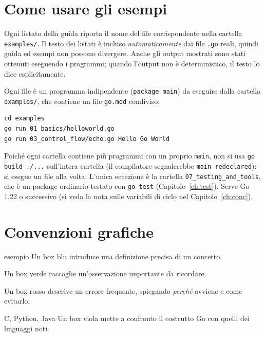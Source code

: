 \documentclass[11pt,a4paper]{report}
\newcommand{\cod}[1]{\texttt{#1}}
\begin{document}
\section*{Come usare gli esempi}

Ogni listato della guida riporta il nome del file corrispondente nella cartella
\texttt{examples/}. Il testo dei listati è incluso \emph{automaticamente} dai file
\texttt{.go} reali, quindi guida ed esempi non possono divergere. Anche gli output
mostrati sono stati ottenuti eseguendo i programmi; quando l'output non è
deterministico, il testo lo dice esplicitamente.

Ogni file è un programma indipendente (\cod{package main}) da eseguire dalla
cartella \texttt{examples/}, che contiene un file \texttt{go.mod} condiviso:

\begin{lstlisting}[style=shell]
cd examples
go run 01_basics/helloworld.go
go run 03_control_flow/echo.go Hello Go World
\end{lstlisting}

Poiché ogni cartella contiene più programmi con un proprio \cod{main}, non si
usa \cod{go build ./...} sull'intera cartella (il compilatore segnalerebbe
\cod{main redeclared}): si esegue un file alla volta. L'unica eccezione è la
cartella \texttt{07\_testing\_and\_tools}, che è un package ordinario testato con
\cod{go test} (Capitolo~\ref{ch:test}). Serve Go 1.22 o successivo (si veda la
nota sulle variabili di ciclo nel Capitolo~\ref{ch:conc}).

\section*{Convenzioni grafiche}

\begin{definizione}{esempio}
Un box blu introduce una definizione precisa di un concetto.
\end{definizione}
\begin{nota}
Un box verde raccoglie un'osservazione importante da ricordare.
\end{nota}
\begin{attenzione}
Un box rosso descrive un errore frequente, spiegando \emph{perché} avviene e come
evitarlo.
\end{attenzione}
\begin{confronto}{C, Python, Java}
Un box viola mette a confronto il costrutto Go con quelli dei linguaggi noti.
\end{confronto}
\end{document}
